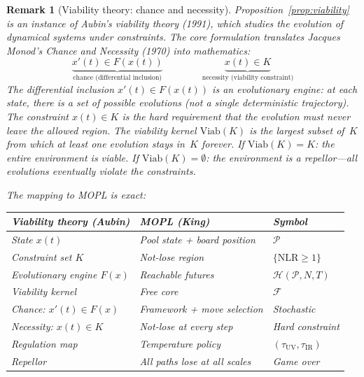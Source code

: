 \documentclass[11pt,a4paper]{article}
\newtheorem{remark}[theorem]{Remark}
\newcommand{\cF}{\mathcal{F}}
\newcommand{\cP}{\mathcal{P}}
\newcommand{\cH}{\mathcal{H}}
\begin{document}
\begin{remark}[Viability theory: chance and necessity]%
\label{rem:viability}
\color{black!60}%
Proposition~\ref{prop:viability} is an instance of
Aubin's \emph{viability theory} (1991), which studies
the evolution of dynamical systems under constraints.
The core formulation translates Jacques Monod's
\emph{Chance and Necessity} (1970) into mathematics:
\[
  \underbrace{x'(t) \in F(x(t))}_
    {\text{chance (differential inclusion)}}
  \qquad\qquad
  \underbrace{x(t) \in K}_
    {\text{necessity (viability constraint)}}
\]
The differential inclusion $x'(t) \in F(x(t))$ is an
\emph{evolutionary engine}: at each state, there is a
\emph{set} of possible evolutions (not a single
deterministic trajectory).
The constraint $x(t) \in K$ is the hard requirement
that the evolution must never leave the allowed region.
The viability kernel $\mathrm{Viab}(K)$ is the largest
subset of~$K$ from which at least one evolution stays
in~$K$ forever.
If $\mathrm{Viab}(K) = K$: the entire environment is
viable.
If $\mathrm{Viab}(K) = \emptyset$: the environment is a
\emph{repellor}---all evolutions eventually violate the
constraints.

\medskip\noindent
The mapping to MOPL is exact:

\begin{center}
\small
\begin{tabular}{@{}lll@{}}
\toprule
\textbf{Viability theory (Aubin)} &
\textbf{MOPL (King)} &
\textbf{Symbol} \\
\midrule
State $x(t)$ &
  Pool state + board position &
  $\cP$ \\
Constraint set $K$ &
  Not-lose region &
  $\{\mathrm{NLR} \geq 1\}$ \\
Evolutionary engine $F(x)$ &
  Reachable futures &
  $\cH(\cP, N, T)$ \\
Viability kernel &
  Free core &
  $\cF$ \\
Chance: $x'(t) \in F(x)$ &
  Framework + move selection &
  Stochastic \\
Necessity: $x(t) \in K$ &
  Not-lose at every step &
  Hard constraint \\
Regulation map &
  Temperature policy &
  $(\tau_{\mathrm{UV}}, \tau_{\mathrm{IR}})$ \\
Repellor &
  All paths lose at all scales &
  Game over \\
\bottomrule
\end{tabular}
\end{center}


\end{remark}
\end{document}
